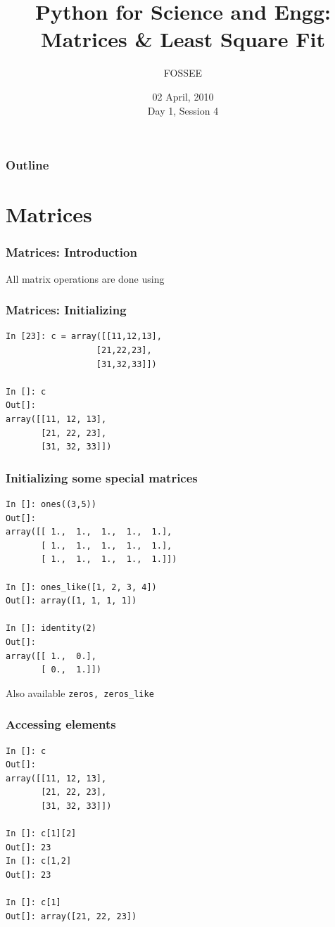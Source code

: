 \documentclass[14pt,compress]{beamer}
\title[Matrices \& Curve Fitting]{Python for Science and Engg: Matrices \& Least Square Fit}
\author[FOSSEE] {FOSSEE}
\institute[IIT Bombay] {Department of Aerospace Engineering\\IIT Bombay}
\date[] {02 April, 2010\\Day 1, Session 4}
\newcommand{\typ}[1]{\lstinline{#1}}
\newcommand{\kwrd}[1]{ \texttt{\textbf{\color{blue}{#1}}}  }
\begin{document}
\begin{frame}
  \titlepage
\end{frame}

\begin{frame}
  \frametitle{Outline}
  \tableofcontents
\end{frame}

\section{Matrices}

\begin{frame}
\frametitle{Matrices: Introduction}
\alert{All matrix operations are done using \kwrd{arrays}}
\end{frame}

\begin{frame}[fragile]
\frametitle{Matrices: Initializing}
\begin{lstlisting}
In [23]: c = array([[11,12,13],
                  [21,22,23],
                  [31,32,33]])

In []: c
Out[]: 
array([[11, 12, 13],
       [21, 22, 23],
       [31, 32, 33]])
\end{lstlisting}
\end{frame}

\begin{frame}[fragile]
\frametitle{Initializing some special matrices}
\begin{small}
  \begin{lstlisting}
In []: ones((3,5))
Out[]: 
array([[ 1.,  1.,  1.,  1.,  1.],
       [ 1.,  1.,  1.,  1.,  1.],
       [ 1.,  1.,  1.,  1.,  1.]])

In []: ones_like([1, 2, 3, 4]) 
Out[]: array([1, 1, 1, 1])   

In []: identity(2)
Out[]: 
array([[ 1.,  0.],
       [ 0.,  1.]])
  \end{lstlisting}
Also available \alert{\typ{zeros, zeros_like}}
\end{small}
\end{frame}


\begin{frame}[fragile]
  \frametitle{Accessing elements}
  \begin{small}
  \begin{lstlisting}
In []: c
Out[]: 
array([[11, 12, 13],
       [21, 22, 23],
       [31, 32, 33]])

In []: c[1][2]
Out[]: 23
In []: c[1,2]
Out[]: 23

In []: c[1]
Out[]: array([21, 22, 23])
  \end{lstlisting}
  \end{small}
\end{frame}
\end{document}
